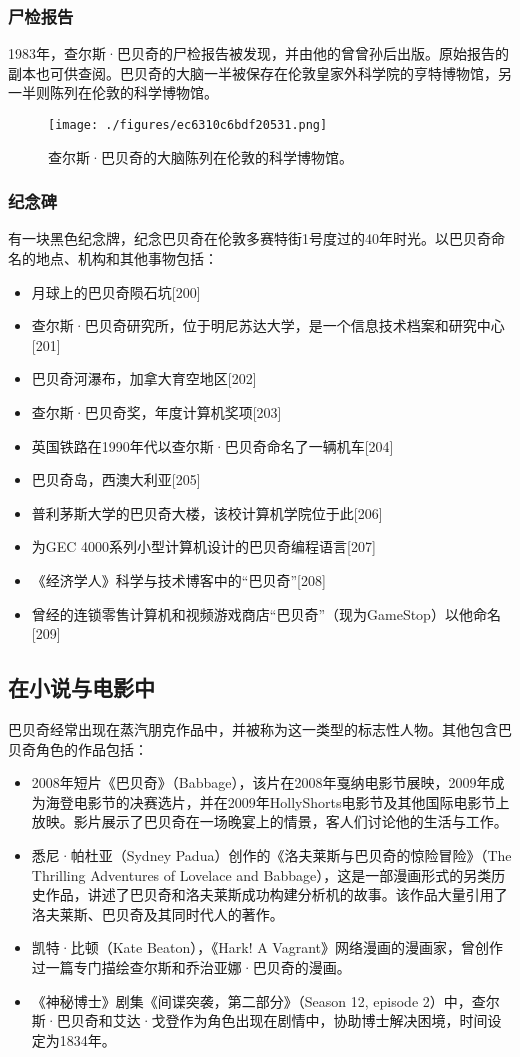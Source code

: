 \subsubsection{尸检报告} 
1983年，查尔斯·巴贝奇的尸检报告被发现，并由他的曾曾孙后出版。原始报告的副本也可供查阅。巴贝奇的大脑一半被保存在伦敦皇家外科学院的亨特博物馆，另一半则陈列在伦敦的科学博物馆。
\begin{figure}[ht]
\centering
\texttt{[image: ./figures/ec6310c6bdf20531.png]}
\caption{查尔斯·巴贝奇的大脑陈列在伦敦的科学博物馆。} \label{fig_CRSBQ_15}
\end{figure}
\subsubsection{纪念碑}
有一块黑色纪念牌，纪念巴贝奇在伦敦多赛特街1号度过的40年时光。以巴贝奇命名的地点、机构和其他事物包括：
\begin{itemize}
\item 月球上的巴贝奇陨石坑[200]
\item 查尔斯·巴贝奇研究所，位于明尼苏达大学，是一个信息技术档案和研究中心[201]
\item 巴贝奇河瀑布，加拿大育空地区[202]
\item 查尔斯·巴贝奇奖，年度计算机奖项[203]
\item 英国铁路在1990年代以查尔斯·巴贝奇命名了一辆机车[204]
\item 巴贝奇岛，西澳大利亚[205]
\item 普利茅斯大学的巴贝奇大楼，该校计算机学院位于此[206]
\item 为GEC 4000系列小型计算机设计的巴贝奇编程语言[207]
\item 《经济学人》科学与技术博客中的“巴贝奇”[208]
\item 曾经的连锁零售计算机和视频游戏商店“巴贝奇”（现为GameStop）以他命名[209]
\end{itemize}
\subsection{在小说与电影中}
巴贝奇经常出现在蒸汽朋克作品中，并被称为这一类型的标志性人物。其他包含巴贝奇角色的作品包括：
\begin{itemize}
\item 2008年短片《巴贝奇》（Babbage），该片在2008年戛纳电影节展映，2009年成为海登电影节的决赛选片，并在2009年HollyShorts电影节及其他国际电影节上放映。影片展示了巴贝奇在一场晚宴上的情景，客人们讨论他的生活与工作。
\item 悉尼·帕杜亚（Sydney Padua）创作的《洛夫莱斯与巴贝奇的惊险冒险》（The Thrilling Adventures of Lovelace and Babbage），这是一部漫画形式的另类历史作品，讲述了巴贝奇和洛夫莱斯成功构建分析机的故事。该作品大量引用了洛夫莱斯、巴贝奇及其同时代人的著作。
\item 凯特·比顿（Kate Beaton），《Hark! A Vagrant》网络漫画的漫画家，曾创作过一篇专门描绘查尔斯和乔治亚娜·巴贝奇的漫画。
\item 《神秘博士》剧集《间谍突袭，第二部分》（Season 12, episode 2）中，查尔斯·巴贝奇和艾达·戈登作为角色出现在剧情中，协助博士解决困境，时间设定为1834年。
\end{itemize}
